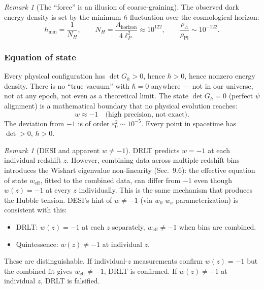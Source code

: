 \documentclass[12pt]{article}
\theoremstyle{remark}
\newtheorem{remark}[theorem]{Remark}
\theoremstyle{definition}
\begin{document}
\begin{remark}[The ``force'' is an illusion of coarse-graining]
The observed dark energy density is set by the minimum $\hbar$ fluctuation over the cosmological horizon:
\begin{equation}
\hbar_\text{min} = \frac{1}{N_H}, \qquad N_H = \frac{A_\text{horizon}}{4\ell_P^2} \approx 10^{122}, \qquad \frac{\rho_\Lambda}{\rho_\text{Pl}} \sim 10^{-122}.
\end{equation}

\subsubsection{Equation of state}

Every physical configuration has $\det G_h > 0$, hence $\hbar > 0$, hence nonzero energy density. There is no ``true vacuum'' with $\hbar = 0$ anywhere --- not in our universe, not at any epoch, not even as a theoretical limit. The state $\det G_h = 0$ (perfect $\psi$ alignment) is a mathematical boundary that no physical evolution reaches:
\begin{equation}
\boxed{w \approx -1 \quad\text{(high precision, not exact)}.}
\end{equation}
The deviation from $-1$ is of order $\varepsilon_0^2 \sim 10^{-5}$. Every point in spacetime has $\det > 0$, $\hbar > 0$.

\begin{remark}[DESI and apparent $w \neq -1$]
DRLT predicts $w = -1$ at each individual redshift $z$. However, combining data across multiple redshift bins introduces the Wishart eigenvalue non-linearity (Sec.~9.6): the effective equation of state $w_\text{eff}$, fitted to the combined data, can differ from $-1$ even though $w(z) = -1$ at every $z$ individually. This is the same mechanism that produces the Hubble tension. DESI's hint of $w \neq -1$ (via $w_0$-$w_a$ parameterization) is consistent with this:

\begin{itemize}
\item DRLT: $w(z) = -1$ at each $z$ separately, $w_\text{eff} \neq -1$ when bins are combined.
\item Quintessence: $w(z) \neq -1$ at individual $z$.
\end{itemize}

These are distinguishable. If individual-$z$ measurements confirm $w(z) = -1$ but the combined fit gives $w_\text{eff} \neq -1$, DRLT is confirmed. If $w(z) \neq -1$ at individual $z$, DRLT is falsified.
\end{remark}


\end{remark}
\end{document}
